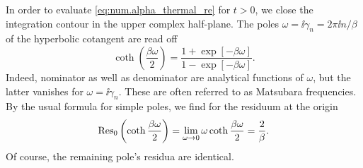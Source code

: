 
In order to evaluate \autoref{eq:num.alpha_thermal_re} for $t > 0$, we close the integration contour in the upper complex half-plane.
The poles $\omega = \ii\gamma_n = 2\pi \ii n / \beta$ of the hyperbolic cotangent are read off
\begin{equation}
  \coth \left( \frac{\beta \omega}{2} \right) = \frac{1 + \exp[-\beta\omega]}{1 - \exp[-\beta\omega]}.
  \label{eq:num.coth_representation}
\end{equation}
Indeed, nominator as well as denominator are analytical functions of $\omega$, but the latter vanishes for $\omega = \ii\gamma_n$.
These are often referred to as Matsubara frequencies.
By the usual formula for simple poles, we find for the residuum at the origin
\begin{equation*}
  \operatorname{Res}_{0} \left( \coth\frac{\beta\omega}{2} \right) = \lim_{\omega\to 0} \omega \coth \frac{\beta\omega}{2} = \frac{2}{\beta}.
\end{equation*}
Of course, the remaining pole's residua are identical.


